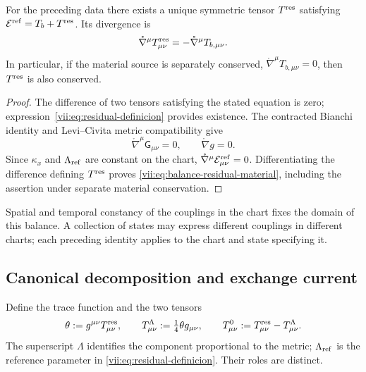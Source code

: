 \begin{theorem}
\label{vii:thm:residual-unicidad-balance}
For the preceding data there exists a unique symmetric tensor
\(T^{\rm res}\) satisfying
\(\mathcal E^{\rm ref}=T_b+T^{\rm res}\). Its divergence is
\begin{equation}
 \mathring\nabla^\mu T^{\rm res}_{\mu\nu}
 =-\mathring\nabla^\mu T_{b,\mu\nu}.
 \label{vii:eq:balance-residual-material}
\end{equation}
In particular, if the material source is separately conserved,
\(\mathring\nabla^\mu T_{b,\mu\nu}=0\), then
\(T^{\rm res}\) is also conserved.
\end{theorem}
\begin{proof}
The difference of two tensors satisfying the stated equation is
zero; expression~\eqref{vii:eq:residual-definicion} provides
existence. The contracted Bianchi identity and Levi--Civita metric
compatibility give
\[
 \mathring\nabla^\mu\mathsf G_{\mu\nu}=0,
 \qquad \mathring\nabla g=0.
\]
Since \(\kappa_x\) and \(\Lambda_{\rm ref}\) are constant on the
chart, \(\mathring\nabla^\mu\mathcal E^{\rm ref}_{\mu\nu}=0\).
Differentiating the difference defining \(T^{\rm res}\) proves
\eqref{vii:eq:balance-residual-material}, including the assertion under
separate material conservation.
\end{proof}

Spatial and temporal constancy of the couplings in the chart fixes
the domain of this balance. A collection of states may express
different couplings in different charts; each preceding identity
applies to the chart and state specifying it.

\subsection{Canonical decomposition and exchange current}
\label{vii:subsec:traza-corriente-residual}

Define the trace function and the two tensors
\begin{equation}
 \theta:=g^{\mu\nu}T^{\rm res}_{\mu\nu},\qquad
 T^{\Lambda}_{\mu\nu}:=\tfrac14\theta g_{\mu\nu},\qquad
 T^{0}_{\mu\nu}:=T^{\rm res}_{\mu\nu}-T^{\Lambda}_{\mu\nu}.
 \label{vii:eq:descomposicion-traza-residual}
\end{equation}
The superscript \(\Lambda\) identifies the component proportional to the
metric; \(\Lambda_{\rm ref}\) is the reference parameter in
\eqref{vii:eq:residual-definicion}. Their roles are distinct.

